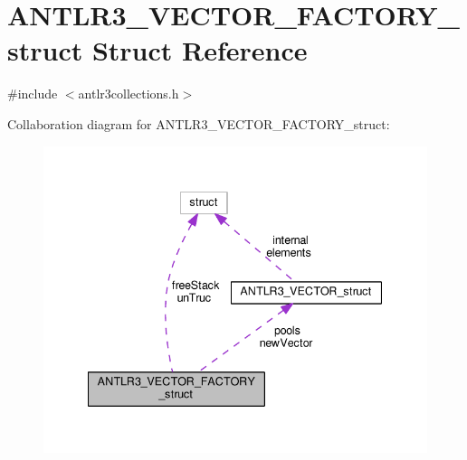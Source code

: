\hypertarget{struct_a_n_t_l_r3___v_e_c_t_o_r___f_a_c_t_o_r_y__struct}{\section{A\-N\-T\-L\-R3\-\_\-\-V\-E\-C\-T\-O\-R\-\_\-\-F\-A\-C\-T\-O\-R\-Y\-\_\-struct Struct Reference}
\label{struct_a_n_t_l_r3___v_e_c_t_o_r___f_a_c_t_o_r_y__struct}
}


{\ttfamily \#include $<$antlr3collections.\-h$>$}



Collaboration diagram for A\-N\-T\-L\-R3\-\_\-\-V\-E\-C\-T\-O\-R\-\_\-\-F\-A\-C\-T\-O\-R\-Y\-\_\-struct\-:
\nopagebreak
\begin{figure}[H]
\begin{center}
\leavevmode
\includegraphics[width=337pt]{struct_a_n_t_l_r3___v_e_c_t_o_r___f_a_c_t_o_r_y__struct__coll__graph}
\end{center}
\end{figure}
